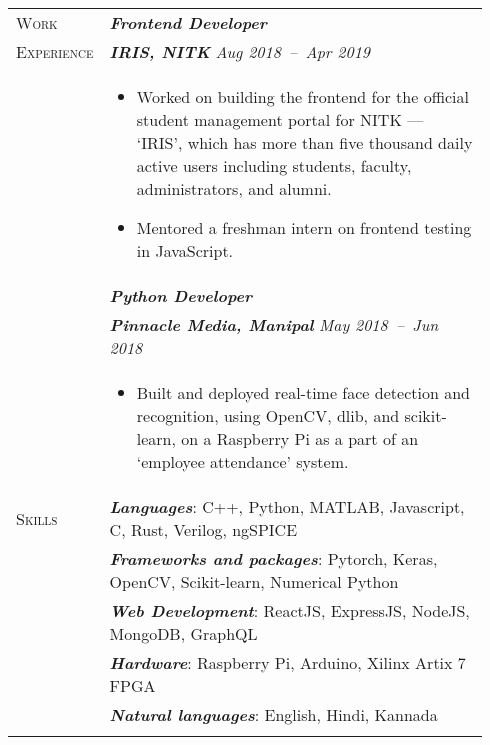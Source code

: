 \documentclass[letterpaper, 10pt, oneside]{article}
\newcommand{\stitle}[1]{\normalsize{\textsc{#1}}}
\newcommand{\bdit}[1]{\textit{\textbf{#1}}}
\begin{document}
\begin{longtable}{@{} p{0.14\linewidth} p{0.8\linewidth}}
\stitle{Work}       & \bdit{Frontend Developer} \\
\stitle{Experience} & \bdit{IRIS, NITK} \hfill \textit{Aug 2018\ --\ Apr 2019} \\
                    & \parbox{0.8\textwidth}{
                        \begin{itemize}[leftmargin=*, itemsep=-0.88ex]
                            \item Worked on building the frontend for the official student management portal for NITK --- `IRIS', which has more than five thousand
                                  daily active users including students, faculty, administrators, and alumni.
                            \item Mentored a freshman intern on frontend testing in JavaScript.
                        \end{itemize}
                    }
\\
                    & \bdit{Python Developer} \\
                    & \bdit{Pinnacle Media, Manipal} \hfill \textit{May 2018\ --\ Jun 2018} \\
                    & \parbox{0.8\textwidth}{
                        \begin{itemize}[leftmargin=*, itemsep=-0.88ex]
                            \item Built and deployed real-time face detection and recognition, using OpenCV, dlib, and scikit-learn, on a Raspberry Pi
                                  as a part of an `employee attendance' system.
                        \end{itemize}
                    }
\\


\stitle{Skills} & \bdit{Languages}: C++, Python, MATLAB, Javascript, C, Rust, Verilog, ngSPICE \\
                & \bdit{Frameworks and packages}: Pytorch, Keras, OpenCV, Scikit-learn, Numerical Python \\
                & \bdit{Web Development}: ReactJS, ExpressJS, NodeJS, MongoDB, GraphQL \\
                & \bdit{Hardware}: Raspberry Pi, Arduino, Xilinx Artix 7 FPGA \\
                & \bdit{Natural languages}: English, Hindi, Kannada \\
\\



\end{longtable}
\end{document}
